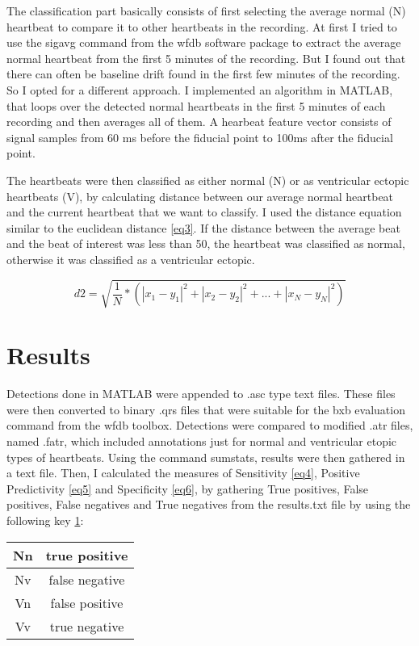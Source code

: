 \documentclass[9pt]{IEEEtran}
\begin{document}
The classification part basically consists of first selecting the average normal (N) heartbeat to compare it to other heartbeats in the recording. At first I tried to use the sigavg command from the wfdb software package to extract the average normal heartbeat from the first 5 minutes of the recording. But I found out that there can often be baseline drift found in the first few minutes of the recording. So I opted for a different approach. I implemented an algorithm in MATLAB, that loops over the detected normal heartbeats in the first 5 minutes of each recording and then averages all of them. A hearbeat feature vector consists of signal samples from 60 ms before the fiducial point to 100ms after the fiducial point. 

The heartbeats were then classified as either normal (N) or as ventricular ectopic heartbeats (V), by calculating distance between our average normal heartbeat and the current heartbeat that we want to classify. I used the distance equation similar to the euclidean distance \ref{eq3}. If the distance between the average beat and the beat of interest was less than 50, the heartbeat was classified as normal, otherwise it was classified as a ventricular ectopic. 
 
\begin{equation} \label{eq3}
d2 =  \sqrt{\dfrac{1}{N} *(|x_1 - y_1|^2 + |x_2 - y_2|^2  + ... + |x_N - y_N|^2 )}
 \end{equation}

\section{Results}

Detections done in MATLAB were appended to .asc type text files. These files were then converted to binary .qrs files that were suitable for the bxb evaluation command from the wfdb toolbox. Detections were compared to modified .atr files, named .fatr, which included annotations just for normal and ventricular etopic types of heartbeats. Using the command sumstats, results were then gathered in a text file. Then, I calculated the measures of Sensitivity \ref{eq4}, Positive Predictivity \ref{eq5} and Specificity \ref{eq6}, by gathering True positives, False positives, False negatives and True negatives from the results.txt file by using the following key \ref{table2}:

\begin{table}[!htb]
\centering
\begin{tabular}{|c|c|} \hline
Nn & true positive \\ \hline
Nv & false negative \\ \hline
Vn & false positive \\ \hline
Vv & true negative  \\ \hline
\end{tabular}
\label{table2}
\end{table}
\end{document}

